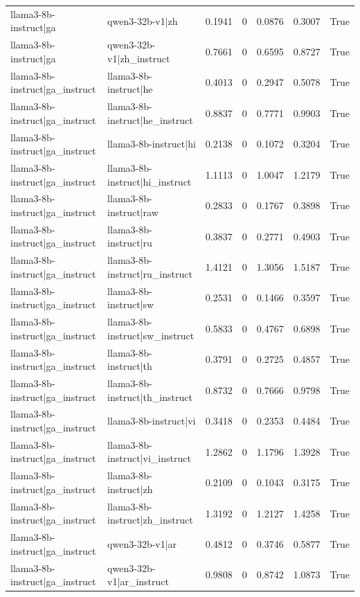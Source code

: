 \begin{table}
\begin{tabular}{l l r r r r l}
llama3-8b-instruct|ga & qwen3-32b-v1|zh & 0.1941 & 0 & 0.0876 & 0.3007 & True \\
llama3-8b-instruct|ga & qwen3-32b-v1|zh_instruct & 0.7661 & 0 & 0.6595 & 0.8727 & True \\
llama3-8b-instruct|ga_instruct & llama3-8b-instruct|he & 0.4013 & 0 & 0.2947 & 0.5078 & True \\
llama3-8b-instruct|ga_instruct & llama3-8b-instruct|he_instruct & 0.8837 & 0 & 0.7771 & 0.9903 & True \\
llama3-8b-instruct|ga_instruct & llama3-8b-instruct|hi & 0.2138 & 0 & 0.1072 & 0.3204 & True \\
llama3-8b-instruct|ga_instruct & llama3-8b-instruct|hi_instruct & 1.1113 & 0 & 1.0047 & 1.2179 & True \\
llama3-8b-instruct|ga_instruct & llama3-8b-instruct|raw & 0.2833 & 0 & 0.1767 & 0.3898 & True \\
llama3-8b-instruct|ga_instruct & llama3-8b-instruct|ru & 0.3837 & 0 & 0.2771 & 0.4903 & True \\
llama3-8b-instruct|ga_instruct & llama3-8b-instruct|ru_instruct & 1.4121 & 0 & 1.3056 & 1.5187 & True \\
llama3-8b-instruct|ga_instruct & llama3-8b-instruct|sw & 0.2531 & 0 & 0.1466 & 0.3597 & True \\
llama3-8b-instruct|ga_instruct & llama3-8b-instruct|sw_instruct & 0.5833 & 0 & 0.4767 & 0.6898 & True \\
llama3-8b-instruct|ga_instruct & llama3-8b-instruct|th & 0.3791 & 0 & 0.2725 & 0.4857 & True \\
llama3-8b-instruct|ga_instruct & llama3-8b-instruct|th_instruct & 0.8732 & 0 & 0.7666 & 0.9798 & True \\
llama3-8b-instruct|ga_instruct & llama3-8b-instruct|vi & 0.3418 & 0 & 0.2353 & 0.4484 & True \\
llama3-8b-instruct|ga_instruct & llama3-8b-instruct|vi_instruct & 1.2862 & 0 & 1.1796 & 1.3928 & True \\
llama3-8b-instruct|ga_instruct & llama3-8b-instruct|zh & 0.2109 & 0 & 0.1043 & 0.3175 & True \\
llama3-8b-instruct|ga_instruct & llama3-8b-instruct|zh_instruct & 1.3192 & 0 & 1.2127 & 1.4258 & True \\
llama3-8b-instruct|ga_instruct & qwen3-32b-v1|ar & 0.4812 & 0 & 0.3746 & 0.5877 & True \\
llama3-8b-instruct|ga_instruct & qwen3-32b-v1|ar_instruct & 0.9808 & 0 & 0.8742 & 1.0873 & True \\

\end{tabular}
\end{table}
